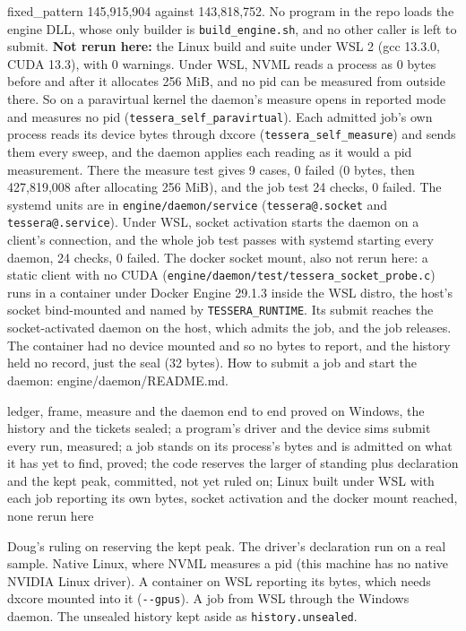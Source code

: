 \begin{description}
fixed\_\allowbreak{}pattern 145,915,904 against 143,818,752. No program in the repo loads the engine DLL, whose only builder is \texttt{build\_\allowbreak{}engine.\allowbreak{}sh}, and no other caller is left to submit. \textbf{Not rerun here:} the Linux build and suite under WSL 2 (gcc 13.3.0, CUDA 13.3), with 0 warnings. Under WSL, NVML reads a process as 0 bytes before and after it allocates 256 MiB, and no pid can be measured from outside there. So on a paravirtual kernel the daemon's measure opens in reported mode and measures no pid (\texttt{tessera\_\allowbreak{}self\_\allowbreak{}paravirtual}). Each admitted job's own process reads its device bytes through dxcore (\texttt{tessera\_\allowbreak{}self\_\allowbreak{}measure}) and sends them every sweep, and the daemon applies each reading as it would a pid measurement. There the measure test gives 9 cases, 0 failed (0 bytes, then 427,819,008 after allocating 256 MiB), and the job test 24 checks, 0 failed. The systemd units are in \texttt{engine/\allowbreak{}daemon/\allowbreak{}service} (\texttt{tessera@.\allowbreak{}socket} and \texttt{tessera@.\allowbreak{}service}). Under WSL, socket activation starts the daemon on a client's connection, and the whole job test passes with systemd starting every daemon, 24 checks, 0 failed. The docker socket mount, also not rerun here: a static client with no CUDA (\texttt{engine/\allowbreak{}daemon/\allowbreak{}test/\allowbreak{}tessera\_\allowbreak{}socket\_\allowbreak{}probe.\allowbreak{}c}) runs in a container under Docker Engine 29.1.3 inside the WSL distro, the host's socket bind-mounted and named by \texttt{TESSERA\_\allowbreak{}RUNTIME}. Its submit reaches the socket-activated daemon on the host, which admits the job, and the job releases. The container had no device mounted and so no bytes to report, and the history held no record, just the seal (32 bytes). How to submit a job and start the daemon: engine/daemon/README.md.
\item[{status}] ledger, frame, measure and the daemon end to end proved on Windows, the history and the tickets sealed; a program's driver and the device sims submit every run, measured; a job stands on its process's bytes and is admitted on what it has yet to find, proved; the code reserves the larger of standing plus declaration and the kept peak, committed, not yet ruled on; Linux built under WSL with each job reporting its own bytes, socket activation and the docker mount reached, none rerun here
\item[{next}] Doug's ruling on reserving the kept peak. The driver's declaration run on a real sample. Native Linux, where NVML measures a pid (this machine has no native NVIDIA Linux driver). A container on WSL reporting its bytes, which needs dxcore mounted into it (\texttt{-\allowbreak{}-\allowbreak{}gpus}). A job from WSL through the Windows daemon. The unsealed history kept aside as \texttt{history.\allowbreak{}unsealed}.
\end{description}

